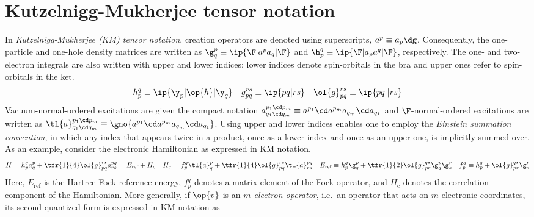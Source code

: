 \chapter{Kutzelnigg-Mukherjee tensor notation}

\begin{ntt}\label{ntt:kutzelnigg-mukherjee-notation}
In \textit{Kutzelnigg-Mukherjee (KM) tensor notation}, creation operators are denoted using superscripts, $a^p\equiv a_p\dg$.
Consequently, the one-particle and one-hole density matrices are written as
$
  \g^p_q
\equiv
  \ip{\F|a^pa_q|\F}
$
and
$
  \h_p^q
\equiv
  \ip{\F|a_p a^q|\F}
$,
respectively.
The one- and two-electron integrals are also written with upper and lower indices: lower indices denote spin-orbitals in the bra and upper ones refer to spin-orbitals in the ket.
\begin{align}
  h_p^q
\equiv
  \ip{\y_p|\op{h}|\y_q}
&&
  g_{pq}^{rs}
\equiv
  \ip{pq|rs}
&&
  \ol{g}_{pq}^{rs}
\equiv
  \ip{pq||rs}
\end{align}
Vacuum-normal-ordered excitations are given the compact notation
$
  a^{p_1\cd p_m}_{q_1\cd q_m}
\equiv
  a^{p_1}\cd a^{p_m}a_{q_m}\cd a_{q_1}
$
and $\F$-normal-ordered excitations are written as
$
  \tl{a}^{p_1\cd p_m}_{q_1\cd q_m}
\equiv
  \gno{a^{p_1}\cd a^{p_m}a_{q_m}\cd a_{q_1}}
$.
Using upper and lower indices enables one to employ the \textit{Einstein summation convention}, in which any index that appears twice in a product, once as a lower index and once as an upper one, is implicitly summed over.
As an example, consider the electronic Hamiltonian as expressed in KM notation.
\begin{align}
  H
=
  h_p^q
  a^p_q
+
  \tfr{1}{4}
  \ol{g}_{pq}^{rs}
  a^{pq}_{rs}
=
  E_{\text{ref}}
+
  H_{\text{c}}
&&
  H_{\text{c}}
=
  f_p^q
  \tl{a}^p_q
+
  \tfr{1}{4}
  \ol{g}_{pq}^{rs}
  \tl{a}^{pq}_{rs}
&&
  E_{\text{ref}}
\equiv
  h_p^q
  \g^p_q
+
  \tfr{1}{2}
  \ol{g}_{pr}^{qs}
  \g^p_q
  \g^r_s
&&
  f_p^q
\equiv
  h_p^q
+
  \ol{g}_{pr}^{qs}
  \g_s^r
\end{align}
Here, $E_{\text{ref}}$ is the Hartree-Fock reference energy, $f_p^q$ denotes a matrix element of the Fock operator, and $H_{\text{c}}$ denotes the correlation component of the Hamiltonian.
More generally, if $\op{v}$ is an \textit{$m$-electron operator}, i.e.\ an operator that acts on $m$ electronic coordinates, its second quantized form is expressed in KM notation as
\begin{align}\label{eq:interaction-tensor}
  \left.

\end{align}
\end{ntt}
